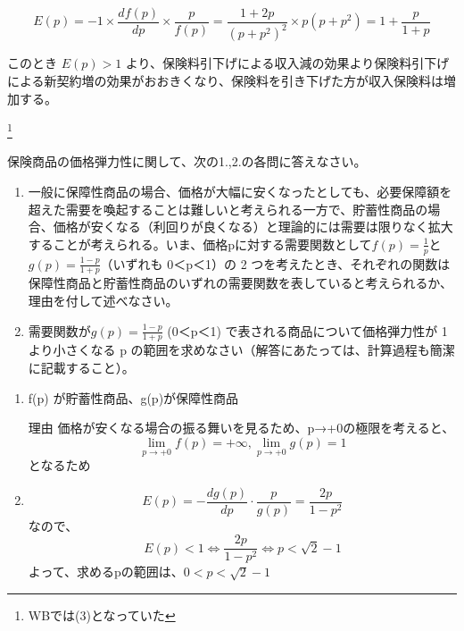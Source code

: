 \documentclass[report,gutter=10mm,fore-edge=10mm,uplatex,dvipdfmx]{jlreq}
\begin{document}

$$E(p)=-1\times\frac{df(p)}{dp}\times\frac{p}{f(p)}
=\frac{1+2p}{(p+p^2)^2}\times p(p+p^2)
= 1 + \frac{p}{1+p}$$

このとき $E(p) > 1$
より、保険料引下げによる収入減の効果より保険料引下げによる新契約増の効果がおおきくなり、保険料を引き下げた方が収入保険料は増加する。

\footnote{WBでは(3)となっていた}

保険商品の価格弾力性に関して、次の1.,2.の各問に答えなさい。

\begin{enumerate}
\item
  一般に保障性商品の場合、価格が大幅に安くなったとしても、必要保障額を超えた需要を喚起することは難しいと考えられる一方で、貯蓄性商品の場合、価格が安くなる（利回りが良くなる）と理論的には需要は限りなく拡大することが考えられる。いま、価格pに対する需要関数として$f(p)=\frac{1}{p}$と$g(p)=\frac{1-p}{1+p}$（いずれも
  0＜p＜1）の 2
  つを考えたとき、それぞれの関数は保障性商品と貯蓄性商品のいずれの需要関数を表していると考えられるか、理由を付して述べなさい。
\item   需要関数が$g(p)=\frac{1-p}{1+p}$   (0＜p＜1)
で表される商品について価格弾力性が  1 より小さくなる p
  の範囲を求めなさい（解答にあたっては、計算過程も簡潔に記載すること）。
\end{enumerate}


\begin{enumerate}
\tightlist
\item
  f(p) が貯蓄性商品、g(p)が保障性商品 

理由
  価格が安くなる場合の振る舞いを見るため、p→+0の極限を考えると、
  $$\lim_{p\to+0}f(p)=+\infty, \lim_{p\to+0}g(p)=1$$ となるため
\item
  $$E(p)=-\frac{dg(p)}{dp}\cdot\frac{p}{g(p)}=\frac{2p}{1-p^2}$$なので、
  $$E(p) < 1 \Leftrightarrow\frac{2p}{1-p^2}\Leftrightarrow p < \sqrt{2}-1$$
  よって、求めるpの範囲は、$0 < p < \sqrt{2}-1$
\end{enumerate}
\end{document}
